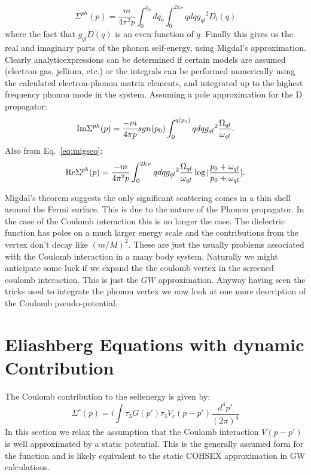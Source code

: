 \documentclass{article}
\begin{document}
%
\begin{equation}
\Sigma^{ph} (p) = \frac{m}{4\pi^{2} p}\int_{0}^{p_{0}}dq_{0}\int_{0}^{2k_{F}}q dq {g_{ql}}^{2}D_{l}(q)
\end{equation}
%
where the fact that $g_{ql}D(q)$ is an even function of $q$.
%
Finally this gives us the real and imaginary parts of the phonon self-energy, using Migdal's approximation.
Clearly  analyticexpressions can be determined if certain models are assumed (electron gas, jellium, etc.) or the
integrals can be performed numerically using the calculated electron-phonon matrix elements, and 
integrated up to the highest frequency phonon mode in the system. Assuming a pole approximation for 
the D propagator:
%
\begin{equation}
{\rm Im} \Sigma^{ph}(p) = \frac{-m}{4\pi p} sgn(p_0)\int_{0}^{q(p_0)}q dq{g_{ql}}^{2}\frac{\Omega_{ql}}{\omega_{ql}}. 
\end{equation}
%
Also from Eq.~\ref{eq:migseq}:
%
\begin{equation}
{\rm Re} \Sigma^{ph}(p) = \frac{-m}{4\pi^{2} p} \int_{0}^{2k_{F}}q dq{g_{ql}}^{2}\frac{\Omega_{ql}}{\omega_{ql}} 
\log|\frac{p_0 +\omega_{ql}}{p_{0}+\omega_{ql}}|.
\end{equation}

Migdal's theorem suggests the only significant scattering comes in a thin shell around the Fermi surface.
This is due to the nature of the Phonon propagator. In the case of the Coulomb interaction this is no longer the case.
The dielectric function has poles on a much larger energy scale and the contributions from the vertex don't
decay like $(m/M)^{2}$. These are just the usually problems associated with the Coulomb interaction in a many body
system. Naturally we might anticipate some luck if we expand the the coulomb vertex in the screened coulomb interaction.
This is just the $GW$ approximation. Anyway having seen the tricks used to integrate the phonon vertex we now look
at one more description of the Coulomb pseudo-potential.
%

\section{Eliashberg Equations with dynamic Contribution}

The Coulomb contribution to the selfenergy is given by:
%
\begin{equation}
\label{eq:selfeng}
\Sigma^{c}(p) = i \int \tau_{3} G(p') \tau_{3} V_{c}(p-p')\frac{d^{4}p'}{(2\pi)^{4}}
\end{equation}
%
In this section we relax the assumption that the Coulomb interaction $V(p-p')$
is well approximated by a static potential. This is the generally assumed form
for the function and is likely equivalent to the static COHSEX approximation in 
GW calculations.
\end{document}
